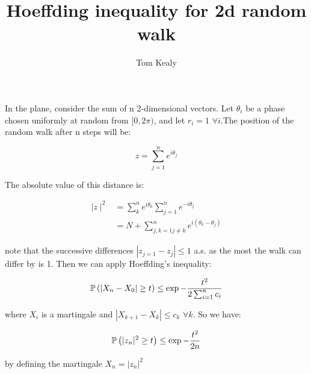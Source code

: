 \documentclass{article}
\title{Hoeffding inequality for 2d random walk}
\author{Tom Kealy}
\begin{document}
\maketitle
In the plane, consider the sum of n 2-dimensional vectors. Let \(\theta_i\) be a phase chosen uniformly at random from \([0,2\pi)\), and let \(r_i = 1\) \(\forall i\).The position of the random walk after n steps will be:

\begin{equation}
z = \sum_{j=1}^n e^{i\theta_j}
\end{equation}

The absolute value of this distance is:

\begin{align*}
\mid z\mid ^2 &= \sum_{k}^ne^{i\theta_k}\sum_{j=1}^n e^{-i\theta_j} \\
&= N + \sum_{j,k=1 j\neq k}^{n} e^{i(\theta_k-\theta_j)}
\end{align*}

note that the successive differences \(|z_{j=1} - z_{j}| \leq 1\) a.s. as the most the walk can differ by is 1. Then we can apply Hoeffding's inequality:

\begin{equation}
{\mathbb{P}}\left(|X_n - X_0| \geq t\right) \leq \exp{-\frac{t^2}{2\sum_{i=1}^n c_i}}
\end{equation} 

where \(X_i\) is a martingale and \(|X_{k+1} - X_k| \leq c_k\) \(\forall k\). So we have:

\begin{equation}
{\mathbb{P}}\left( |z_n|^2 \geq t \right) \leq \exp{-\frac{t^2}{2n}}
\end{equation}

by defining the martingale \(X_n = |z_n|^2\)
\end{document}
